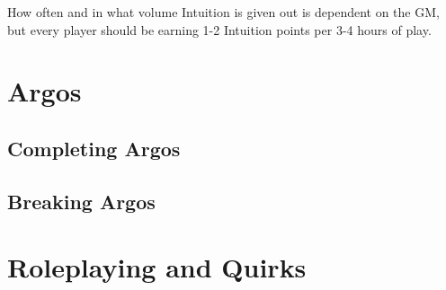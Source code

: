 \documentclass[../main.tex]{subfiles}
\begin{document}
        How often and in what volume Intuition is given out is dependent on the GM, but every player should be earning 1-2 Intuition points per 3-4 hours of play.

    \section{Argos}



    \subsection{Completing Argos}

    \subsection{Breaking Argos}

    \section{Roleplaying and Quirks}
\end{document}
